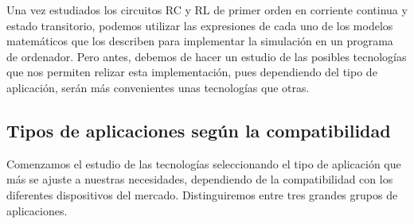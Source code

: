 \documentclass[../main.tex]{subfiles}
\begin{document}
Una vez estudiados los circuitos RC y RL de primer orden en corriente continua y estado transitorio, podemos utilizar las expresiones de cada uno de los modelos matemáticos que los describen para implementar la simulación en un programa de ordenador. Pero antes, debemos de hacer un estudio de las posibles tecnologías que nos permiten relizar esta implementación, pues dependiendo del tipo de aplicación, serán más convenientes unas tecnologías que otras.

\subsection{Tipos de aplicaciones según la compatibilidad}
Comenzamos el estudio de las tecnologías seleccionando el tipo de aplicación que más se ajuste a nuestras necesidades, dependiendo de la compatibilidad con los diferentes dispositivos del mercado. Distinguiremos entre tres grandes grupos de aplicaciones.
\end{document}
